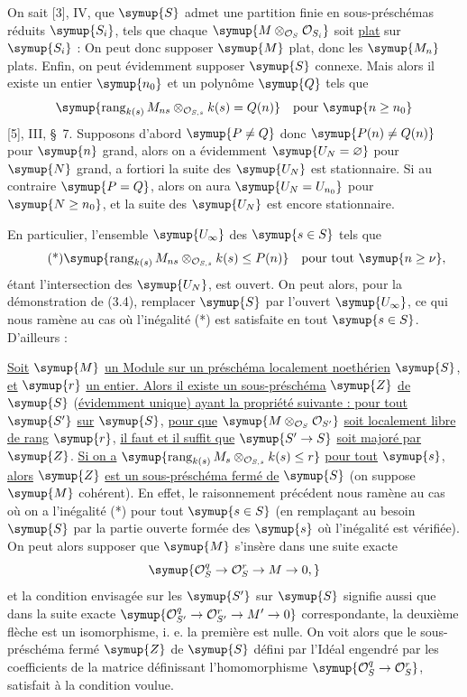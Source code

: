 On sait [3], IV, que $\symup{S}$ admet une partition finie en sous-préschémas réduits
$\symup{S_i}$, tels que chaque $\symup{M\otimes_{\mathcal O_S}\mathcal O_{S_i}}$ soit \uline{plat} sur
$\symup{S_i}$ : On peut donc supposer $\symup{M}$ plat, donc les $\symup{M_n}$ plats. Enfin, on peut
évidemment supposer $\symup{S}$ connexe. Mais alors il existe un entier $\symup{n_0}$ et un
polynôme $\symup{Q}$ tels que
\[
\symup{\operatorname{rang}_{k(s)}
M_{ns}\otimes_{\mathcal O_{S,s}}k(s)=Q(n)}
\quad\text{pour $\symup{n\geq n_0}$}
\]
[5], III, \S~7. Supposons d'abord $\symup{P\neq Q}$ donc
$\symup{P(n)\neq Q(n)}$ pour $\symup{n}$ grand, alors on a évidemment $\symup{U_N=\varnothing}$ pour $\symup{N}$
grand, a fortiori la suite des $\symup{U_N}$ est stationnaire. Si au contraire $\symup{P=Q}$, alors on aura $\symup{U_N=U_{n_0}}$ pour $\symup{N\geq n_0}$,
et la suite des $\symup{U_N}$ est encore stationnaire.

En particulier, l'ensemble $\symup{U_\infty}$ des $\symup{s\in S}$ tels que
\[
\tag{*}
\symup{\operatorname{rang}_{k(s)}
M_{ns}\otimes_{\mathcal O_{S,s}}k(s)\leq P(n)}
\quad\text{pour tout $\symup{n\geq\nu}$},
\]
étant l'intersection des $\symup{U_N}$, est ouvert. On peut alors, pour la démonstration
de (3.4), remplacer $\symup{S}$ par l'ouvert $\symup{U_\infty}$, ce qui nous ramène au cas où
l'inégalité (*) est satisfaite en tout $\symup{s\in S}$. D'ailleurs :

 \uline{Soit} $\symup{M}$ \uline{un Module sur un préschéma localement noethérien}
$\symup{S}$, \uline{et} $\symup{r}$ \uline{un entier. Alors il existe un sous-préschéma} $\symup{Z}$ \uline{de} $\symup{S}$
(\uline{évidemment unique) ayant la propriété suivante : pour tout} $\symup{S'}$ \uline{sur} $\symup{S}$, \uline{pour
que} $\symup{M\otimes_{\mathcal O_S}\mathcal O_{S'}}$ \uline{soit localement libre de rang} $\symup{r}$,
\uline{il faut et il suffit que} $\symup{S'\to S}$ \uline{soit majoré par} $\symup{Z}$. \uline{Si on a}
$\symup{\operatorname{rang}_{k(s)}M_s\otimes_{\mathcal O_{S,s}}k(s)\leq r}$
\uline{pour tout} $\symup{s}$, \uline{alors} $\symup{Z}$ \uline{est un sous-préschéma fermé de} $\symup{S}$ (on suppose $\symup{M}$ cohérent).
En effet, le raisonnement précédent nous ramène au cas où on a l'inégalité (*)
pour tout $\symup{s\in S}$ (en remplaçant au besoin $\symup{S}$ par la partie ouverte formée
des $\symup{s}$ où l'inégalité est vérifiée). On peut alors supposer que $\symup{M}$ s'insère
dans une suite exacte
\[
\symup{\mathcal O_S^q\to\mathcal O_S^r\to M\to0,}
\]
et la condition envisagée sur les $\symup{S'}$ sur $\symup{S}$ signifie aussi que dans la suite
exacte $\symup{\mathcal O_{S'}^q\to\mathcal O_{S'}^r
\to M'\to0}$ correspondante, la deuxième flèche est un
isomorphisme, i. e. la première est nulle. On voit alors que le sous-préschéma
fermé $\symup{Z}$ de $\symup{S}$ défini par l'Idéal engendré par les coefficients de la matrice
définissant l'homomorphisme
$\symup{\mathcal O_S^q\to\mathcal O_S^r}$, satisfait à la condition voulue.

